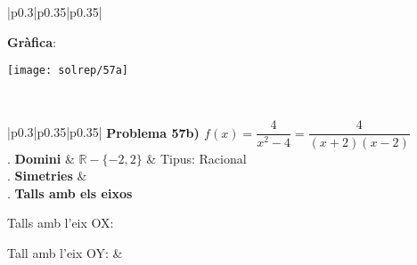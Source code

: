 \documentclass[11pt, a4paper, twoside, pdf]{book}
\begin{document}
\begin{center}
\begin{longtable}[h]{|p{}|p{}|p{}|}
		 {\textbf{Gràfica}: 
			
			\begin{center}
				\texttt{[image: solrep/57a]}
			\end{center}
		}
		\\  [1.5ex] \hline 
	\end{longtable}
\end{center}
\newpage






\begin{center}
	\setlength\LTleft{0pt}
	\setlength\LTright{0pt}
	\fontsize{10.5}{11}
	\def\arraystretch{1.01}
	\begin{longtable}[h]{|p{}|p{}|p{}|}
		\hline
		 { 
			 \textbf{Problema 57b) $f(x)=\dfrac{4}{x^2-4}=\dfrac{4}{(x+2)(x-2)}$} }
		\\  [1.5ex] . \textbf{Domini} & $\mathbb{R}-\{-2,2\}$ & Tipus: Racional  \\  [1.5ex] . \textbf{Simetries} &  \\  [1.5ex] . \textbf{Talls amb els eixos}
		
		Talls amb l'eix OX:
		
		Tall amb l'eix OY: &  \\  [1.5ex] \hline
		

\end{longtable}
\end{center}
\end{document}
